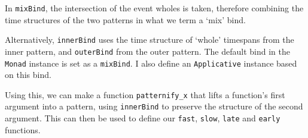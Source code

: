 In \texttt{mixBind}, the intersection of the event wholes is taken,
therefore combining the time structures of the two patterns in what we
term a `mix' bind.

Alternatively, \texttt{innerBind} uses the time structure of `whole'
timespans from the inner pattern, and \texttt{outerBind} from the outer
pattern. The default bind in the \texttt{Monad} instance is set as a
\texttt{mixBind}. I also define an \texttt{Applicative} instance based
on this bind.

\begin{Shaded}
\begin{Highlighting}[]
   
\NormalTok{  (}\OperatorTok{\textgreater{}\textgreater{}=}\NormalTok{) }\OtherTok{=}

   
   \OtherTok{=}
\OperatorTok{\textless{}*\textgreater{}}\OtherTok{=}\OperatorTok{\textgreater{}\textgreater{}=}\NormalTok{ (}\OperatorTok{\textless{}$\textgreater{}}
\end{Highlighting}
\end{Shaded}

Using this, we can make a function \texttt{patternify\_x} that lifts a
function's first argument into a pattern, using \texttt{innerBind} to
preserve the structure of the second argument. This can then be used to
define our \texttt{fast}, \texttt{slow}, \texttt{late} and
\texttt{early} functions.

\begin{Shaded}
\begin{Highlighting}[]
\OtherTok{{-}\textgreater{}} \OtherTok{{-}\textgreater{}} \OtherTok{{-}\textgreater{}}
\NormalTok{  (}\OtherTok{{-}\textgreater{}} \OtherTok{{-}\textgreater{}} 
\OtherTok{=}\OtherTok{{-}\textgreater{}}

   \OtherTok{{-}\textgreater{}} \OtherTok{{-}\textgreater{}} 
\OtherTok{=}
\OtherTok{=}
\OtherTok{=}
\OtherTok{=}
\end{Highlighting}
\end{Shaded}

